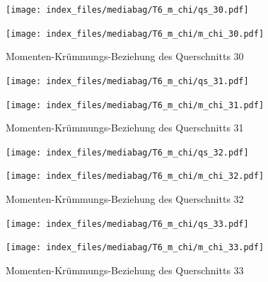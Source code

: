 \documentclass[
  11pt,
  letterpaper,
]{scrreprt}
\begin{document}
\begin{figure}[H]

\begin{minipage}{0.50\linewidth}
\texttt{[image: index\_files/mediabag/T6\_m\_chi/qs\_30.pdf]}\end{minipage}%
%
\begin{minipage}{0.50\linewidth}
\texttt{[image: index\_files/mediabag/T6\_m\_chi/m\_chi\_30.pdf]}\end{minipage}%

\caption{\label{fig-mchi_anhang}Momenten-Krümmungs-Beziehung des
Querschnitts 30}

\end{figure}%

\begin{figure}[H]

\begin{minipage}{0.50\linewidth}
\texttt{[image: index\_files/mediabag/T6\_m\_chi/qs\_31.pdf]}\end{minipage}%
%
\begin{minipage}{0.50\linewidth}
\texttt{[image: index\_files/mediabag/T6\_m\_chi/m\_chi\_31.pdf]}\end{minipage}%

\caption{\label{fig-mchi_anhang}Momenten-Krümmungs-Beziehung des
Querschnitts 31}

\end{figure}%

\begin{figure}[H]

\begin{minipage}{0.50\linewidth}
\texttt{[image: index\_files/mediabag/T6\_m\_chi/qs\_32.pdf]}\end{minipage}%
%
\begin{minipage}{0.50\linewidth}
\texttt{[image: index\_files/mediabag/T6\_m\_chi/m\_chi\_32.pdf]}\end{minipage}%

\caption{\label{fig-mchi_anhang}Momenten-Krümmungs-Beziehung des
Querschnitts 32}

\end{figure}%

\begin{figure}[H]

\begin{minipage}{0.50\linewidth}
\texttt{[image: index\_files/mediabag/T6\_m\_chi/qs\_33.pdf]}\end{minipage}%
%
\begin{minipage}{0.50\linewidth}
\texttt{[image: index\_files/mediabag/T6\_m\_chi/m\_chi\_33.pdf]}\end{minipage}%

\caption{\label{fig-mchi_anhang}Momenten-Krümmungs-Beziehung des
Querschnitts 33}

\end{figure}%
\end{document}
